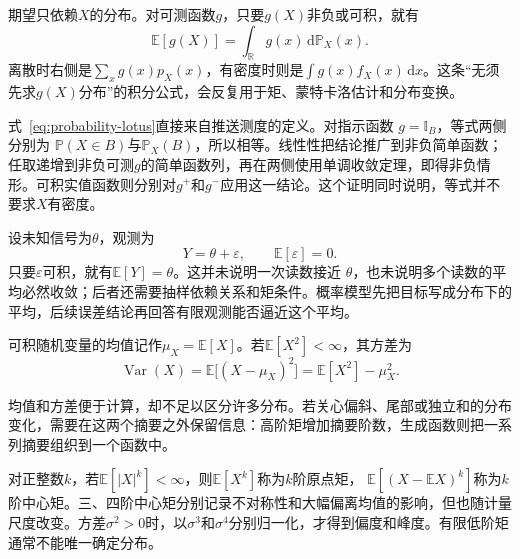 期望只依赖\(X\)的分布。对可测函数\(g\)，只要\(g(X)\)非负或可积，就有
\begin{equation}
  \mathbb{E}[g(X)]
  =
  \int_{\mathbb{R}}g(x)\,\mathrm{d}\mathbb{P}_X(x).
  \label{eq:probability-lotus}
\end{equation}
离散时右侧是\(\sum_x g(x)p_X(x)\)，有密度时则是\(\int g(x)f_X(x)\,\mathrm{d}x\)。这条“无须先求\(g(X)\)分布”的积分公式，会反复用于矩、蒙特卡洛估计和分布变换。

式~\eqref{eq:probability-lotus}直接来自推送测度的定义。对指示函数
\(g=\mathbb{I}_B\)，等式两侧分别为
\(\mathbb{P}(X\in B)\)与\(\mathbb{P}_X(B)\)，所以相等。线性性把结论推广到非负简单函数；任取递增到非负可测\(g\)的简单函数列，再在两侧使用单调收敛定理，即得非负情形。可积实值函数则分别对\(g^+\)和\(g^-\)应用这一结论。这个证明同时说明，等式并不要求\(X\)有密度。

\begin{example}[带噪观测的平均目标]
\label{ex:probability-noisy-observation}
设未知信号为\(\theta\)，观测为
\[ Y=\theta+\varepsilon,
  \qquad\mathbb{E}[\varepsilon]=0. \]
只要\(\varepsilon\)可积，就有\(\mathbb{E}[Y]=\theta\)。这并未说明一次读数接近
\(\theta\)，也未说明多个读数的平均必然收敛；后者还需要抽样依赖关系和矩条件。概率模型先把目标写成分布下的平均，后续误差结论再回答有限观测能否逼近这个平均。
\end{example}
可积随机变量的均值记作\(\mu_X=\mathbb{E}[X]\)。若\(\mathbb{E}[X^2]<\infty\)，其方差为
\[ \operatorname{Var}(X)
  =\mathbb{E}\bigl[(X-\mu_X)^2\bigr]=\mathbb{E}[X^2]-\mu_X^2. \]

均值和方差便于计算，却不足以区分许多分布。若关心偏斜、尾部或独立和的分布变化，需要在这两个摘要之外保留信息：高阶矩增加摘要阶数，生成函数则把一系列摘要组织到一个函数中。

对正整数\(k\)，若\(\mathbb{E}[|X|^k]<\infty\)，则\(\mathbb{E}[X^k]\)称为\(k\)阶原点矩，
\(\mathbb{E}[(X-\mathbb{E}X)^k]\)称为\(k\)阶中心矩。三、四阶中心矩分别记录不对称性和大幅偏离均值的影响，但也随计量尺度改变。方差\(\sigma^2>0\)时，以\(\sigma^3\)和\(\sigma^4\)分别归一化，才得到偏度和峰度。有限低阶矩通常不能唯一确定分布。

